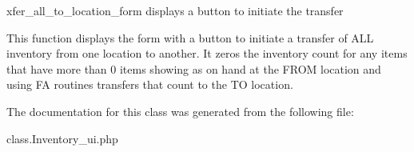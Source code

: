 xfer\+\_\+all\+\_\+to\+\_\+location\+\_\+form displays a button to initiate the transfer

This function displays the form with a button to initiate a transfer of A\+LL inventory from one location to another. It zero\textquotesingle{}s the inventory count for any items that have more than 0 items showing as on hand at the F\+R\+OM location and using FA routines transfers that count to the TO location. 

The documentation for this class was generated from the following file\+:\begin{DoxyCompactItemize}
\item 
class.\+Inventory\+\_\+ui.\+php\end{DoxyCompactItemize}

